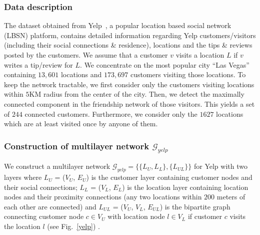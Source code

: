 \subsubsection{Data description}
  The dataset obtained from Yelp~\cite{gupta2015complementary}, a popular location based social network (LBSN) platform,
  contains detailed information regarding Yelp
  customers/visitors (including their social connections \& residence),
  locations and the tips \& reviews posted by the customers. We assume that a customer $v$ visits a location $L$ if $v$ writes a
  tip/review for $L$.
  We concentrate on the most popular city ``Las Vegas''
  containing $13,601$ locations and $173,697$ customers visiting those locations. To keep the network tractable, we first
  consider only the customers visiting locations within $5$KM radius from the center of the city. Then, we detect
  the maximally connected component in the friendship network of those visitors. This yields a set
  of $244$ connected customers. Furthermore, we consider only the $1627$ locations which are at least visited once by anyone of them.

\subsubsection{Construction of multilayer network $\mathcal{G}_{yelp}$}
We construct a multilayer network $\mathcal{G}_{yelp} =\{\{L_U, L_L\},\{L_{UL}\}\}$ for Yelp with two layers
where $L_U$ = ($V_U$, $E_U$) is the customer layer containing customer nodes and their social connections; $L_L$ = ($V_L$, $E_L$)
is the location layer containing location nodes and their proximity connections (any two locations within $200$ meters of each other are
connected)
and $L_{UL}$ = ($V_U$, $V_L$, $E_{UL}$) is the bipartite graph connecting customer node $c \in V_U$ with location node $l \in V_L$ if
customer $c$ visits the location $l$ (see Fig.~\ref{yelp}) .

